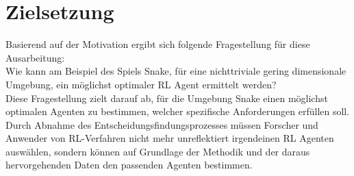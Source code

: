 \section{Zielsetzung} \label{sec:Einleitung_Forschungsfrage}
Basierend auf der Motivation ergibt sich folgende Fragestellung für diese Ausarbeitung:\\
Wie kann am Beispiel des Spiels Snake, für eine nichttriviale gering dimensionale Umgebung, ein möglichst optimaler RL Agent ermittelt werden?\\
Diese Fragestellung zielt darauf ab, für die Umgebung Snake einen möglichst optimalen Agenten zu bestimmen, welcher spezifische Anforderungen erfüllen soll.\\
Durch Abnahme des Entscheidungsfindungsprozesses müssen Forscher und Anwender von RL-Verfahren nicht mehr unreflektiert irgendeinen RL Agenten auswählen, sondern können auf Grundlage der Methodik und der daraus hervorgehenden Daten den passenden Agenten bestimmen.

